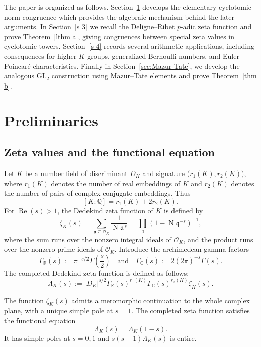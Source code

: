 \documentclass[11pt,table]{amsart}
\numberwithin{equation}{section}
\begin{document}
\par The paper is organized as follows.  Section~\ref{s 2} develops the elementary
cyclotomic norm congruence which provides the algebraic mechanism behind
the later arguments.  In Section~\ref{s 3} we recall the
Deligne--Ribet \(p\)-adic zeta function and prove
Theorem~\ref{lthm a}, giving congruences between special zeta values in
cyclotomic towers.  Section~\ref{s 4} records several arithmetic applications,
including consequences for higher \(K\)-groups, generalized Bernoulli
numbers, and Euler--Poincar\'e characteristics.  Finally
in Section~\ref{sec:Mazur-Tate}, we develop the analogous \(\mathrm{GL}_2\)
construction using Mazur--Tate elements and prove Theorem~\ref{thm b}.
\section{Preliminaries}\label{s 2}
\subsection{Zeta values and the functional equation}
\par Let \(K\) be a number field of discriminant \(D_K\) and signature $\bigl(r_1(K),r_2(K)\bigr)$,
where \(r_1(K)\) denotes the number of real embeddings of \(K\) and
\(r_2(K)\) denotes the number of pairs of complex-conjugate embeddings.
Thus
\[
        [K:\mathbb Q]=r_1(K)+2r_2(K).
\]
For \(\operatorname{Re}(s)>1\), the Dedekind zeta function of \(K\) is
defined by
\[
        \zeta_K(s)
        =
        \sum_{\mathfrak a\subseteq\mathcal O_K}
        \frac{1}{\operatorname{N}\mathfrak a^{\,s}}
        =
        \prod_{\mathfrak q}
        \left(
        1-\operatorname{N}\mathfrak q^{-s}
        \right)^{-1},
\]
where the sum runs over the nonzero integral ideals of
\(\mathcal O_K\), and the product runs over the nonzero prime ideals of
\(\mathcal O_K\). Introduce the archimedean gamma factors
\[
        \Gamma_{\mathbb R}(s)
        :=
        \pi^{-s/2}\Gamma\left(\frac{s}{2}\right)\quad
\text{and}\quad
        \Gamma_{\mathbb C}(s)
        :=
        2(2\pi)^{-s}\Gamma(s).
\]
The completed Dedekind zeta function is defined as follows:
\[
        \Lambda_K(s)
        :=
        |D_K|^{s/2}
        \Gamma_{\mathbb R}(s)^{r_1(K)}
        \Gamma_{\mathbb C}(s)^{r_2(K)}
        \zeta_K(s).
\]

\par The function \(\zeta_K(s)\) admits a meromorphic continuation to
the whole complex plane, with a unique simple pole at \(s=1\). The
completed zeta function satisfies the functional equation
\[
        \Lambda_K(s)=\Lambda_K(1-s).
\]
It has simple poles at \(s=0,1\) and $s(s-1)\Lambda_K(s)$ is entire.
\end{document}
